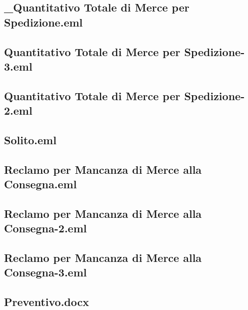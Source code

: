 \documentclass[a4paper,12pt]{report}
\begin{document}
\subsection{\_Quantitativo Totale di Merce per Spedizione.eml}
\vspace{5pt}


\subsection{Quantitativo Totale di Merce per Spedizione-3.eml}
\vspace{5pt}


\subsection{Quantitativo Totale di Merce per Spedizione-2.eml}
\vspace{5pt}


\subsection{Solito.eml}
\vspace{5pt}


\subsection{Reclamo per Mancanza di Merce alla Consegna.eml}
\vspace{5pt}


\subsection{Reclamo per Mancanza di Merce alla Consegna-2.eml}
\vspace{5pt}


\subsection{Reclamo per Mancanza di Merce alla Consegna-3.eml}
\vspace{5pt}


\subsection{Preventivo.docx}
\vspace{5pt}

\end{document}
